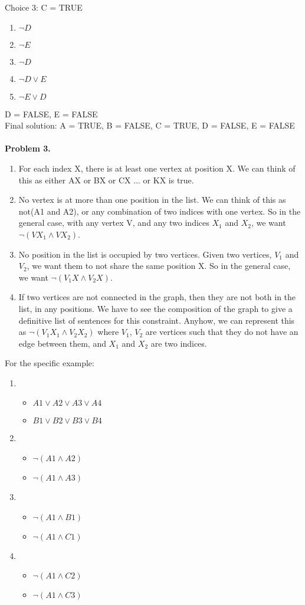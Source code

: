\documentclass{article}
\begin{document}
Choice 3: C = TRUE
\begin{enumerate}
	\item $\neg D$
	\item $\neg E$
	\item $\neg D$
	\item $\neg D\vee E$
	\item $\neg E\vee D$
\end{enumerate}
D = FALSE, E = FALSE\\
Final solution: A = TRUE, B = FALSE, C = TRUE, D = FALSE, E = FALSE\\
\\
\textbf{Problem 3.}
\begin{enumerate}
	\item For each index X, there is at least one vertex at position X. We can think of this as either AX or BX or CX ... or KX is true.
	\item No vertex is at more than one position in the list. We can think of this as not(A1 and A2), or any combination of two indices with one vertex. So in the general case, with any vertex V, and any two indices $X_1$ and $X_2$, we want $\neg(VX_1\wedge VX_2)$.
	\item No position in the list is occupied by two vertices. Given two vertices, $V_1$ and $V_2$, we want them to not share the same position X. So in the general case, we want $\neg(V_1X\wedge V_2X)$.
	\item If two vertices are not connected in the graph, then they are not both in the list, in any positions. We have to see the composition of the graph to give a definitive list of sentences for this constraint. Anyhow, we can represent this as $\neg(V_1X_1\wedge V_2X_2)$ where $V_1$, $V_2$ are vertices such that they do not have an edge between them, and $X_1$ and $X_2$ are two indices.
\end{enumerate}
For the specific example:
\begin{enumerate}
	\item \begin{itemize}
		  	\item $A1\vee A2\vee A3\vee A4$
		  	\item $B1\vee B2\vee B3\vee B4$
		  \end{itemize}
	\item \begin{itemize}
			\item $\neg(A1\wedge A2)$
			\item $\neg(A1\wedge A3)$
		  \end{itemize}
	\item \begin{itemize}
			\item $\neg(A1\wedge B1)$
			\item $\neg(A1\wedge C1)$
		  \end{itemize}
	\item \begin{itemize}
			\item $\neg(A1\wedge C2)$
			\item $\neg(A1\wedge C3)$
		  \end{itemize}
\end{enumerate}
\end{document}
